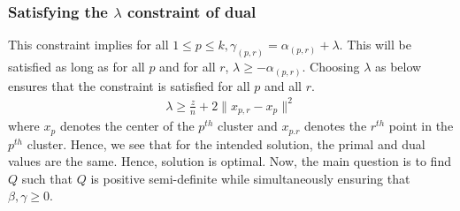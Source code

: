 \documentclass[12pt]{article}
\begin{document}
\subsubsection*{Satisfying the $\lambda$ constraint of dual}
This constraint implies for all $1 \le p \le k, \gamma_{(p,r)} = \alpha_{(p,r)} + \lambda$. This will be satisfied as long as for all $p$ and for all $r$, $\lambda \ge -\alpha_{(p, r)}$. Choosing $\lambda$ as below ensures that the constraint is satisfied for all $p$ and all $r$.
\begin{align}
\lambda \ge \frac{z}{n} + 2\|x_{p,r} - x_p\|^2\label{a-eqn:lambdaLower}
\end{align}
where $x_p$ denotes the center of the $p^{th}$ cluster and $x_{p. r}$ denotes the $r^{th}$ point in the $p^{th}$ cluster. Hence, we see that for the intended solution, the primal and dual values are the same. Hence, solution is optimal. Now, the main question is to find $Q$ such that $Q$ is positive semi-definite while simultaneously ensuring that $\beta, \gamma \ge 0$.  
\end{document}
